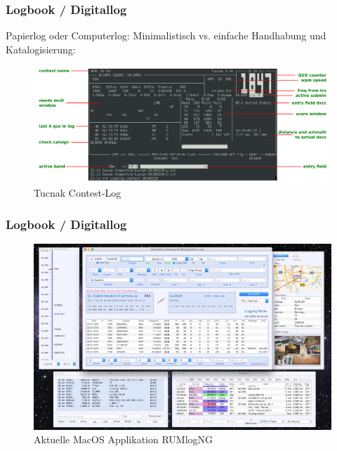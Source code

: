 \begin{frame}
  \frametitle{Logbook / Digitallog}

  Papierlog oder Computerlog: Minimalistisch vs. einfache Handhabung und
  Katalogisierung:

  \begin{center}
    \begin{figure}
      \includegraphics[width=1\textwidth,height=.75\textheight,keepaspectratio]{bv13/tucnak_Hf-10.png}
      \caption{Tucnak Contest-Log \hyperlink{refs}{\cite{tucn}}}
    \end{figure}
  \end{center}

\end{frame}

\begin{frame}
  \frametitle{Logbook / Digitallog}
  \begin{center}
    \begin{figure}
      \includegraphics[width=\textwidth,height=.75\textheight,keepaspectratio]{bv13/rumlogng.jpg}
      \caption{Aktuelle MacOS Applikation RUMlogNG \hyperlink{refs}{\cite{rumlog}}}
    \end{figure}
  \end{center}
\end{frame}

